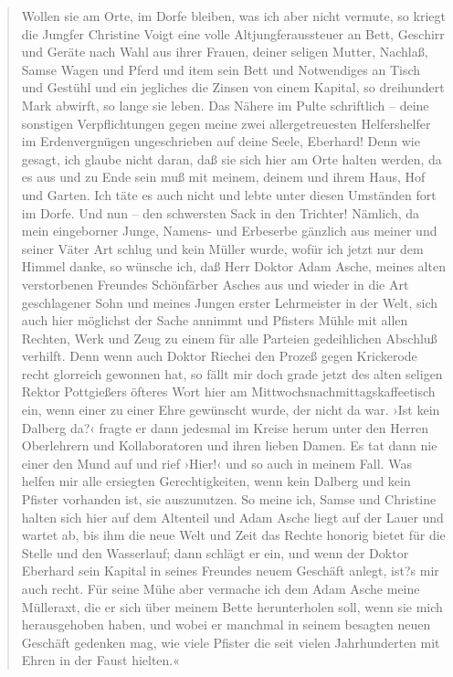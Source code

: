 \begin{verse}
Wollen sie am Orte, im Dorfe bleiben, was ich aber nicht vermute,
so kriegt die Jungfer Christine Voigt eine volle
Altjungferaussteuer an Bett, Geschirr und Geräte nach Wahl aus
ihrer Frauen, deiner seligen Mutter, Nachlaß, Samse Wagen und Pferd
und item sein Bett und Notwendiges an Tisch und Gestühl und ein
jegliches die Zinsen von einem Kapital, so dreihundert Mark
abwirft, so lange sie leben. Das Nähere im Pulte schriftlich –
deine sonstigen Verpflichtungen gegen meine zwei allergetreuesten
Helfershelfer im Erdenvergnügen ungeschrieben auf deine Seele,
Eberhard! Denn wie gesagt, ich glaube nicht daran, daß sie sich
hier am Orte halten werden, da es aus und zu Ende sein muß mit
meinem, deinem und ihrem Haus, Hof und Garten. Ich täte es auch
nicht und lebte unter diesen Umständen fort im Dorfe. Und nun – den
schwersten Sack in den Trichter! Nämlich, da mein eingeborner
Junge, Namens- und Erbeserbe gänzlich aus meiner und seiner Väter
Art schlug und kein Müller wurde, wofür ich jetzt nur dem Himmel
danke, so wünsche ich, daß Herr Doktor Adam Asche, meines alten
verstorbenen Freundes Schönfärber Asches aus und wieder in die Art
geschlagener Sohn und meines Jungen erster Lehrmeister in der Welt,
sich auch hier möglichst der Sache annimmt und Pfisters Mühle mit
allen Rechten, Werk und Zeug zu einem für alle Parteien
gedeihlichen Abschluß verhilft. Denn wenn auch Doktor Riechei den
Prozeß gegen Krickerode recht glorreich gewonnen hat, so fällt mir
doch grade jetzt des alten seligen Rektor Pottgießers öfteres Wort
hier am Mittwochsnachmittagskaffeetisch ein, wenn einer zu einer
Ehre gewünscht wurde, der nicht da war. ›Ist kein Dalberg da?‹
fragte er dann jedesmal im Kreise herum unter den Herren
Oberlehrern und Kollaboratoren und ihren lieben Damen. Es tat dann
nie einer den Mund auf und rief ›Hier!‹ und so auch in meinem Fall.
Was helfen mir alle ersiegten Gerechtigkeiten, wenn kein Dalberg
und kein Pfister vorhanden ist, sie auszunutzen. So meine ich,
Samse und Christine halten sich hier auf dem Altenteil und Adam
Asche liegt auf der Lauer und wartet ab, bis ihm die neue Welt und
Zeit das Rechte honorig bietet für die Stelle und den Wasserlauf;
dann schlägt er ein, und wenn der Doktor Eberhard sein Kapital in
seines Freundes neuem Geschäft anlegt, ist?s mir auch recht. Für
seine Mühe aber vermache ich dem Adam Asche meine Mülleraxt, die er
sich über meinem Bette herunterholen soll, wenn sie mich
herausgehoben haben, und wobei er manchmal in seinem besagten neuen
Geschäft gedenken mag, wie viele Pfister die seit vielen
Jahrhunderten mit Ehren in der Faust hielten.«


\end{verse}
